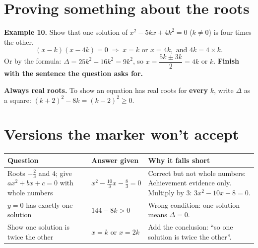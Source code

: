 \documentclass[11pt]{article}
\begin{document}
\section{Proving something about the roots}\label{h3:prove}
\textbf{Example 10.} Show that one solution of $x^{2} - 5kx + 4k^{2} = 0$ ($k \neq 0$) is four times the other.
\[ (x - k)(x - 4k) = 0 \;\Rightarrow\; x = k \text{ or } x = 4k, \text{ and } 4k = 4 \times k. \]
Or by the formula: $\Delta = 25k^{2} - 16k^{2} = 9k^{2}$, so $x = \dfrac{5k \pm 3k}{2} = 4k$ or $k$. \textbf{Finish with the sentence the question asks for.}

\textbf{Always real roots.} To show an equation has real roots for \textbf{every} $k$, write $\Delta$ as a square: $(k+2)^{2} - 8k = (k-2)^{2} \geq 0$.

\section{Versions the marker won't accept}\label{h3:wontaccept}
\begin{tabularx}{\textwidth}{@{}>{\raggedright}p{} >{\raggedright}p{} X@{}}
\toprule
\textbf{Question} & \textbf{Answer given} & \textbf{Why it falls short} \\ \midrule
Roots $-\frac{2}{3}$ and $4$; give $ax^{2} + bx + c = 0$ with whole numbers & $x^{2} - \frac{10}{3}x - \frac{8}{3} = 0$ & Correct but not whole numbers: Achievement evidence only. Multiply by 3: $3x^{2} - 10x - 8 = 0$. \tabularnewline
$y = 0$ has exactly one solution & $144 - 8k > 0$ & Wrong condition: one solution means $\Delta = 0$. \tabularnewline
Show one solution is twice the other & $x = k$ or $x = 2k$ & Add the conclusion: ``so one solution is twice the other''. \tabularnewline
\bottomrule
\end{tabularx}

\end{document}
